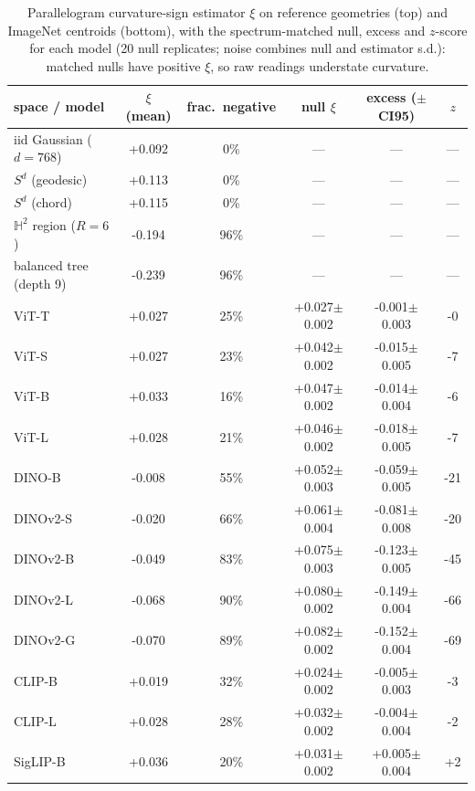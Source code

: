 \begin{table}[H]
\centering
\small
\begin{tabular}{lccccc}
\toprule
space / model & $\xi$ (mean) & frac.\ negative & null $\xi$ & excess ($\pm$CI95) & $z$ \\
\midrule
iid Gaussian ($d{=}768$) & +0.092 & 0\% & --- & --- & --- \\
$S^{d}$ (geodesic) & +0.113 & 0\% & --- & --- & --- \\
$S^{d}$ (chord) & +0.115 & 0\% & --- & --- & --- \\
\midrule
$\mathbb{H}^2$ region ($R{=}6$) & -0.194 & 96\% & --- & --- & --- \\
balanced tree (depth 9) & -0.239 & 96\% & --- & --- & --- \\
ViT-T & +0.027 & 25\% & +0.027$\pm$0.002 & -0.001$\pm$0.003 & -0 \\
ViT-S & +0.027 & 23\% & +0.042$\pm$0.002 & -0.015$\pm$0.005 & -7 \\
ViT-B & +0.033 & 16\% & +0.047$\pm$0.002 & -0.014$\pm$0.004 & -6 \\
ViT-L & +0.028 & 21\% & +0.046$\pm$0.002 & -0.018$\pm$0.005 & -7 \\
DINO-B & -0.008 & 55\% & +0.052$\pm$0.003 & -0.059$\pm$0.005 & -21 \\
DINOv2-S & -0.020 & 66\% & +0.061$\pm$0.004 & -0.081$\pm$0.008 & -20 \\
DINOv2-B & -0.049 & 83\% & +0.075$\pm$0.003 & -0.123$\pm$0.005 & -45 \\
DINOv2-L & -0.068 & 90\% & +0.080$\pm$0.002 & -0.149$\pm$0.004 & -66 \\
DINOv2-G & -0.070 & 89\% & +0.082$\pm$0.002 & -0.152$\pm$0.004 & -69 \\
CLIP-B & +0.019 & 32\% & +0.024$\pm$0.002 & -0.005$\pm$0.003 & -3 \\
CLIP-L & +0.028 & 28\% & +0.032$\pm$0.002 & -0.004$\pm$0.004 & -2 \\
SigLIP-B & +0.036 & 20\% & +0.031$\pm$0.002 & +0.005$\pm$0.004 & +2 \\
\bottomrule
\end{tabular}
\caption{Parallelogram curvature-sign estimator $\xi$ on reference geometries (top) and ImageNet centroids (bottom), with the spectrum-matched null, excess and $z$-score for each model (20 null replicates; noise combines null and estimator s.d.): matched nulls have positive $\xi$, so raw readings understate curvature.}
\label{tab:a10}
\end{table}
